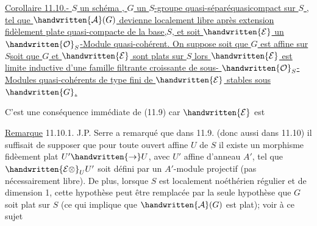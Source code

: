 \uline{Corollaire 11.10.-  $S$ un  schéma , $G$ un $S$-groupe quasi-séparéquasicompact sur $S$ , tel que $\handwritten{\mathcal{A}}(G)$ devienne  localement libre après extension fidèlement plate quasi-compacte de la base,$S$, et soit $\handwritten{\mathcal{E}}$ un $\handwritten{\mathcal{O}}_S$-Module quasi-cohérent. On suppose soit que $G$ est affine sur $S$\handwritten{,}soit que $G$ et $\handwritten{\mathcal{E}}$ sont plats sur $S$ lors $\handwritten{\mathcal{E}}$ est limite inductive d'une famille filtrante croissante de sous- $\handwritten{\mathcal{O}}_S$-Modules quasi-cohérents de type fini de $\handwritten{\mathcal{E}}$ stables sous $\handwritten{G}$.}

C'est une conséquence immédiate de (11.9) car $\handwritten{\mathcal{E}}$ est 

\uline{Remarque} 11.10.1. J.P. Serre a remarqué que dans 11.9. (donc aussi dans 11.10) il suffisait de supposer que pour toute ouvert affine $U$ de $S$\unsure{;|,} il existe un morphisme fidèement plat $U'\handwritten{\to}U$, avec $U'$ affine d'anneau $A'$, tel que $\handwritten{\mathcal{E}\otimes}_U U'$ soit défini par un $A'$-module projectif (pas nécessairement libre). De plus, lorsque $S$ est localement noéthérien régulier et de dimension 1, cette hypothèse peut être remplacée par la seule hypothèse que $G$ soit plat sur $S$ (ce qui implique que $\handwritten{\mathcal{A}}(G)$ est plat); voir à ce sujet  


